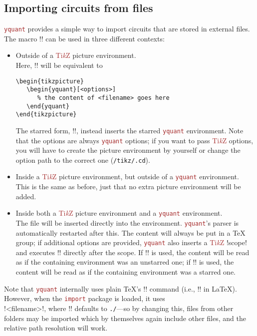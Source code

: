 \documentclass{scrartcl}
\def\TikZ{\textcolor{brown}{Ti\textit kZ}}
\def\pkg#1{\textcolor{brown}{\texttt{#1}}}
\def\Yquant{\pkg{yquant}}
\begin{document}
      \subsection[Importing circuit from files]{Importing circuits from files}\label{sec:import}
         \Yquant{} provides a simple way to import circuits that are stored in external files.
         The macro \tex!\yquantimport! can be used in three different contexts:
         \begin{itemize}
            \item Outside of a \TikZ{} picture environment. \\
               Here, \tex!! will be equivalent to
               \begin{verbatim}
\begin{tikzpicture}
   \begin{yquant}[<options>]
      % the content of <filename> goes here
   \end{yquant}
\end{tikzpicture}
               \end{verbatim}
               The starred form, \tex!!, instead inserts the starred \Yquant{} environment.
               Note that the options are always \Yquant{} options; if you want to pass \TikZ{} options, you will have to create the picture environment by yourself or change the option path to the correct one (\texttt{/tikz/.cd}).
            \item Inside a \TikZ{} picture environment, but outside of a \Yquant{} environment. \\
               This is the same as before, just that no extra picture environment will be added.
            \item Inside both a \TikZ{} picture environment and a \Yquant{} environment. \\
               The file will be inserted directly into the environment.
               \Yquant's parser is automatically restarted after this.
               The content will always be put in a \TeX{} group; if additional options are provided, \Yquant{} also inserts a \TikZ{} \tex!scope! and executes \tex!! directly after the scope.
               If \tex!\yquantimport! is used, the content will be read as if the containing environment was an unstarred one; if \tex!\yquantimport*! is used, the content will be read as if the containing environment was a starred one.
         \end{itemize}
         Note that \Yquant{} internally uses plain \TeX's \tex!! command (i.e., \tex!\@@import! in \LaTeX).
         However, when the \pkg{import} package is loaded, it uses \\ \tex!{<filename>}!, where \tex!\yquantimportpath! defaults to \texttt{./}---so by changing this, files from other folders may be imported which by themselves again include other files, and the relative path resolution will work.
\end{document}
